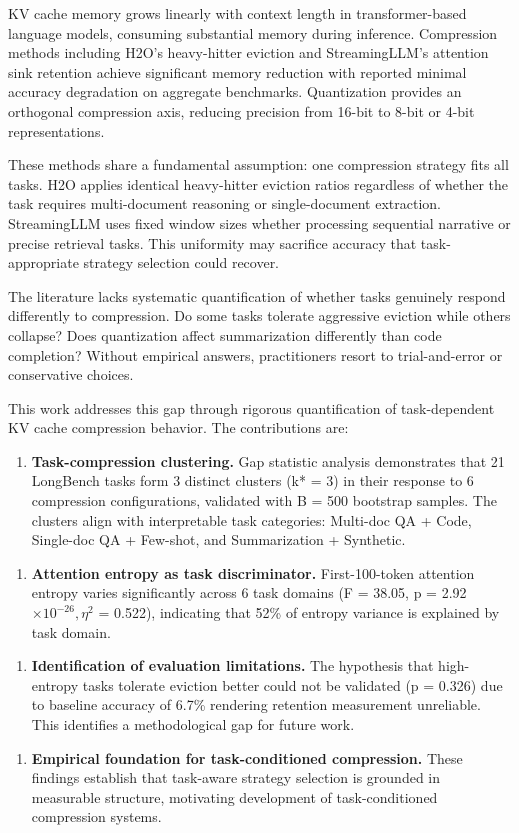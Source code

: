 
KV cache memory grows linearly with context length in transformer-based language models, consuming substantial memory during inference. Compression methods including H2O's heavy-hitter eviction and StreamingLLM's attention sink retention achieve significant memory reduction with reported minimal accuracy degradation on aggregate benchmarks. Quantization provides an orthogonal compression axis, reducing precision from 16-bit to 8-bit or 4-bit representations.

These methods share a fundamental assumption: one compression strategy fits all tasks. H2O applies identical heavy-hitter eviction ratios regardless of whether the task requires multi-document reasoning or single-document extraction. StreamingLLM uses fixed window sizes whether processing sequential narrative or precise retrieval tasks. This uniformity may sacrifice accuracy that task-appropriate strategy selection could recover.

The literature lacks systematic quantification of whether tasks genuinely respond differently to compression. Do some tasks tolerate aggressive eviction while others collapse? Does quantization affect summarization differently than code completion? Without empirical answers, practitioners resort to trial-and-error or conservative choices.

This work addresses this gap through rigorous quantification of task-dependent KV cache compression behavior. The contributions are:

\begin{enumerate}
\item \textbf{Task-compression clustering.} Gap statistic analysis demonstrates that 21 LongBench tasks form 3 distinct clusters (k* = 3) in their response to 6 compression configurations, validated with B = 500 bootstrap samples. The clusters align with interpretable task categories: Multi-doc QA + Code, Single-doc QA + Few-shot, and Summarization + Synthetic.
\end{enumerate}

\begin{enumerate}
\item \textbf{Attention entropy as task discriminator.} First-100-token attention entropy varies significantly across 6 task domains (F = 38.05, p = 2.92 $\times 10^{-26}, \eta^2$ = 0.522), indicating that 52\% of entropy variance is explained by task domain.
\end{enumerate}

\begin{enumerate}
\item \textbf{Identification of evaluation limitations.} The hypothesis that high-entropy tasks tolerate eviction better could not be validated (p = 0.326) due to baseline accuracy of 6.7\% rendering retention measurement unreliable. This identifies a methodological gap for future work.
\end{enumerate}

\begin{enumerate}
\item \textbf{Empirical foundation for task-conditioned compression.} These findings establish that task-aware strategy selection is grounded in measurable structure, motivating development of task-conditioned compression systems.
\end{enumerate}
